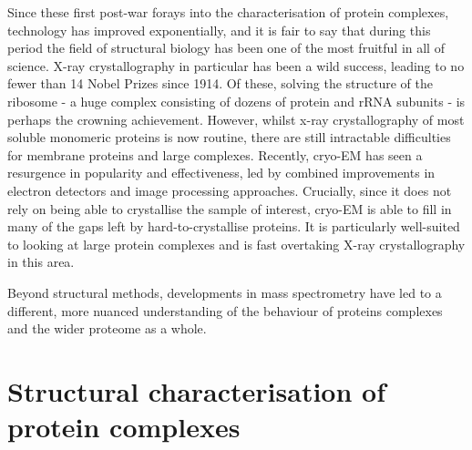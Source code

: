 \documentclass[a4paper,11pt,twoside,openright]{scrbook}
\begin{document}
Since these first post-war forays into the characterisation of protein complexes, technology has improved exponentially, and it is fair to say that during this period the field of structural biology has been one of the most fruitful in all of science. X-ray crystallography in particular has been a wild success, leading to no fewer than 14 Nobel Prizes since 1914. Of these, solving the structure of the ribosome - a huge complex consisting of dozens of protein and rRNA subunits - is perhaps the crowning achievement. However, whilst x-ray crystallography of most soluble monomeric proteins is now routine, there are still intractable difficulties for membrane proteins and large complexes. Recently, cryo-EM has seen a resurgence in popularity and effectiveness, led by combined improvements in electron detectors and image processing approaches. Crucially, since it does not rely on being able to crystallise the sample of interest, cryo-EM is able to fill in many of the gaps left by hard-to-crystallise proteins. It is particularly well-suited to looking at large protein complexes and is fast overtaking X-ray crystallography in this area.

Beyond structural methods, developments in mass spectrometry have led to a different, more nuanced understanding of the behaviour of proteins complexes and the wider proteome as a whole.



\section{Structural characterisation of protein complexes}
\end{document}
